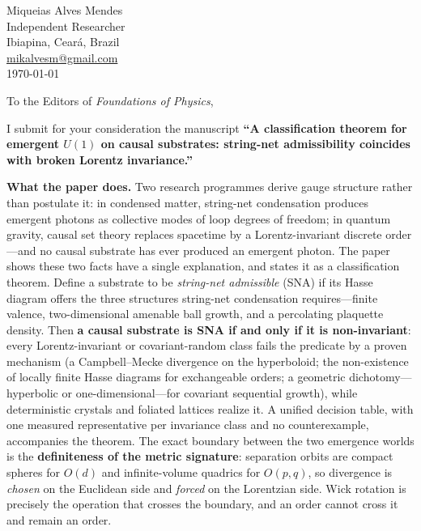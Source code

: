 \documentclass[11pt]{article}
\begin{document}
\begin{flushright}
Miqueias Alves Mendes\\
Independent Researcher\\
Ibiapina, Cear\'a, Brazil\\
\href{mailto:mikalvesm@gmail.com}{mikalvesm@gmail.com}\\[4pt]
\today
\end{flushright}

\vspace{6pt}
\noindent To the Editors of \emph{Foundations of Physics},

\vspace{6pt}
I submit for your consideration the manuscript \textbf{``A classification
theorem for emergent $U(1)$ on causal substrates: string-net admissibility
coincides with broken Lorentz invariance.''}

\textbf{What the paper does.} Two research programmes derive gauge structure
rather than postulate it: in condensed matter, string-net condensation
produces emergent photons as collective modes of loop degrees of freedom; in
quantum gravity, causal set theory replaces spacetime by a Lorentz-invariant
discrete order---and no causal substrate has ever produced an emergent
photon. The paper shows these two facts have a single explanation, and states
it as a classification theorem. Define a substrate to be \emph{string-net
admissible} (SNA) if its Hasse diagram offers the three structures string-net
condensation requires---finite valence, two-dimensional amenable ball growth,
and a percolating plaquette density. Then \textbf{a causal substrate is SNA
if and only if it is non-invariant}: every Lorentz-invariant or
covariant-random class fails the predicate by a proven mechanism (a
Campbell--Mecke divergence on the hyperboloid; the non-existence of locally
finite Hasse diagrams for exchangeable orders; a geometric
dichotomy---hyperbolic or one-dimensional---for covariant sequential growth),
while deterministic crystals and foliated lattices realize it. A unified
decision table, with one measured representative per invariance class and no
counterexample, accompanies the theorem. The exact boundary between the two
emergence worlds is the \textbf{definiteness of the metric signature}:
separation orbits are compact spheres for $O(d)$ and infinite-volume quadrics
for $O(p,q)$, so divergence is \emph{chosen} on the Euclidean side and
\emph{forced} on the Lorentzian side. Wick rotation is precisely the
operation that crosses the boundary, and an order cannot cross it and remain
an order.
\end{document}
